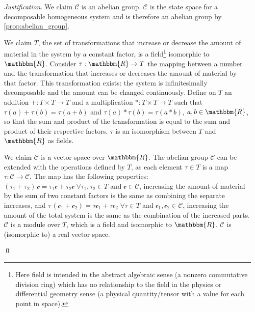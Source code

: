 \documentclass[aps,pra,10pt,twocolumn,floatfix,nofootinbib]{revtex4-1}
\numberwithin{equation}{section}
\theoremstyle{definition}
\newenvironment{justification}{\emph{Justification}.}{\qed}
\begin{document}
\begin{justification}
We claim $\mathcal{C}$ is an abelian group. $\mathcal{C}$ is the state space for a decomposable homogeneous system and is therefore an abelian group  by \ref{prop:abelian_group}.

We claim $T$, the set of transformations that increase or decrease the amount of material in the system by a constant factor, is a field\footnote{Here field is intended in the abstract algebraic sense (a nonzero commutative division ring) which has no relationship to the field in the physics or differential geometry sense (a physical quantity/tensor with a value for each point in space).} isomorphic to $\mathbbm{R}$. Consider $\tau: \mathbbm{R} \rightarrow T$ the mapping between a number and the transformation that increases or decreases the amount of material by that factor. This transformation exists: the system is infinitesimally decomposable and the amount can be changed continuously. Define on $T$ an addition $+: T \times T \rightarrow T$ and a multiplication $*: T \times T \rightarrow T$ such that $\tau(a) + \tau(b) = \tau(a+b)$ and $\tau(a) * \tau(b) = \tau(a*b)$, $a,b \in \mathbbm{R}$, so that the sum and product of the transformation is equal to the sum and product of their respective factors. $\tau$ is an isomorphism between $T$ and $\mathbbm{R}$ as fields.

We claim $\mathcal{C}$ is a vector space over $\mathbbm{R}$. The abelian group $\mathcal{C}$ can be extended with the operations defined by $T$, as each element $\tau \in T$ is a map $\tau : \mathcal{C} \rightarrow \mathcal{C}$. The map has the following properties: $(\tau_1 + \tau_2) \, \mathcal{c} = \tau_1 \mathcal{c} + \tau_2 \mathcal{c} \; \forall \tau_1, \tau_2 \in T$ and $\mathcal{c} \in \mathcal{C}$, increasing the amount of material by the sum of two constant factors is the same as combining the separate increases, and $\tau \, (\mathcal{c}_1 + \mathcal{c}_2) = \tau \mathcal{c}_1 + \tau \mathcal{c}_2\; \forall \tau \in T$ and $\mathcal{c}_1, \mathcal{c}_2 \in \mathcal{C}$, increasing the amount of the total system is the same as the combination of the increased parts. $\mathcal{C}$ is a module over $T$, which is a field and isomorphic to $\mathbbm{R}$. $\mathcal{C}$ is (isomorphic to) a real vector space.


\end{justification}
\end{document}
